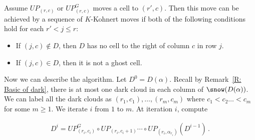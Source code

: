 \begin{rem}
\label{R: K-Kohnert move}
Assume $UP_{(r,c)}$ or $UP^G_{(r,c)}$ moves a cell to $(r',c)$.
Then this move can be achieved by a sequence of $K$-Kohnert moves
if both of the following conditions hold for each $r' < j \leq r$:
\begin{itemize}
\item If $(j, c)\notin D$,
then $D$ has no cell to the right of column $c$ in row $j$.
\item If $(j, c)\in D$, then it is not a ghost cell.
\end{itemize}
\end{rem}


Now we can describe the algorithm.
Let $D^{0} = D(\alpha)$. Recall by Remark~\ref{R: Basic of dark}, there is at most one dark cloud in each column of $\snow(D(\alpha))$. 
We can label all the dark clouds as $(r_1,c_1),\dots, (r_{m},c_{m})$ where $c_1<c_2\dots <c_m$ for some $m\geqslant 1$. We iterate $i$ from $1$ to $m$.
At iteration $i$, compute

\begin{align}
\label{EQ: UP}
D^i = UP^G_{(r_i,c_i)} \circ UP_{(r_i,c_i + 1)} \cdots \circ UP_{(r_i,\alpha_{r_i})} (D^{i-1})\,.    
\end{align}

